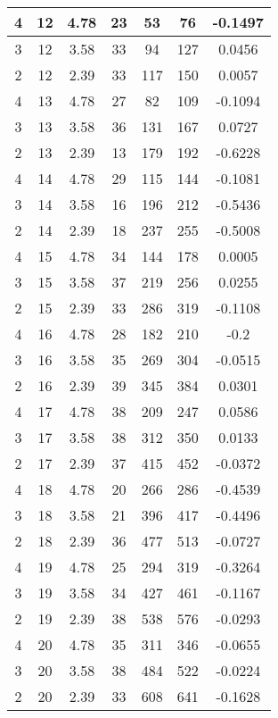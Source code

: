 \documentclass[letterpaper, 12pt]{article}
\begin{document}
\begin{longtable}{|c|c|c|c|c|c|c|}
\hline
4 & 12 & 4.78 & 23 & 53 & 76 & -0.1497 \\
\hline
3 & 12 & 3.58 & 33 & 94 & 127 & 0.0456 \\
\hline
2 & 12 & 2.39 & 33 & 117 & 150 & 0.0057 \\
\hline
4 & 13 & 4.78 & 27 & 82 & 109 & -0.1094 \\
\hline
3 & 13 & 3.58 & 36 & 131 & 167 & 0.0727 \\
\hline
2 & 13 & 2.39 & 13 & 179 & 192 & -0.6228 \\
\hline
4 & 14 & 4.78 & 29 & 115 & 144 & -0.1081 \\
\hline
3 & 14 & 3.58 & 16 & 196 & 212 & -0.5436 \\
\hline
2 & 14 & 2.39 & 18 & 237 & 255 & -0.5008 \\
\hline
4 & 15 & 4.78 & 34 & 144 & 178 & 0.0005 \\
\hline
3 & 15 & 3.58 & 37 & 219 & 256 & 0.0255 \\
\hline
2 & 15 & 2.39 & 33 & 286 & 319 & -0.1108 \\
\hline
4 & 16 & 4.78 & 28 & 182 & 210 & -0.2 \\
\hline
3 & 16 & 3.58 & 35 & 269 & 304 & -0.0515 \\
\hline
2 & 16 & 2.39 & 39 & 345 & 384 & 0.0301 \\
\hline
4 & 17 & 4.78 & 38 & 209 & 247 & 0.0586 \\
\hline
3 & 17 & 3.58 & 38 & 312 & 350 & 0.0133 \\
\hline
2 & 17 & 2.39 & 37 & 415 & 452 & -0.0372 \\
\hline
4 & 18 & 4.78 & 20 & 266 & 286 & -0.4539 \\
\hline
3 & 18 & 3.58 & 21 & 396 & 417 & -0.4496 \\
\hline
2 & 18 & 2.39 & 36 & 477 & 513 & -0.0727 \\
\hline
4 & 19 & 4.78 & 25 & 294 & 319 & -0.3264 \\
\hline
3 & 19 & 3.58 & 34 & 427 & 461 & -0.1167 \\
\hline
2 & 19 & 2.39 & 38 & 538 & 576 & -0.0293 \\
\hline
4 & 20 & 4.78 & 35 & 311 & 346 & -0.0655 \\
\hline
3 & 20 & 3.58 & 38 & 484 & 522 & -0.0224 \\
\hline
2 & 20 & 2.39 & 33 & 608 & 641 & -0.1628 \\
\hline
\end{longtable}
\end{document}
